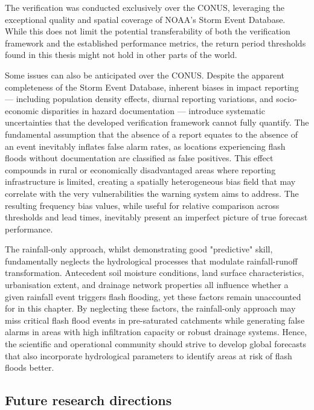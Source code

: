 The verification was conducted exclusively over the CONUS, leveraging the exceptional quality and spatial coverage of NOAA's Storm Event Database. While this does not limit the potential transferability of both the verification framework and the established performance metrics, the return period thresholds found in this thesis might not hold in other parts of the world. 

Some issues can also be anticipated over the CONUS. Despite the apparent completeness of the Storm Event Database, inherent biases in impact reporting — including population density effects, diurnal reporting variations, and socio-economic disparities in hazard documentation \citep{Marjerison_2016} — introduce systematic uncertainties that the developed verification framework cannot fully quantify. The fundamental assumption that the absence of a report equates to the absence of an event inevitably inflates false alarm rates, as locations experiencing flash floods without documentation are classified as false positives. This effect compounds in rural or economically disadvantaged areas where reporting infrastructure is limited, creating a spatially heterogeneous bias field that may correlate with the very vulnerabilities the warning system aims to address. The resulting frequency bias values, while useful for relative comparison across thresholds and lead times, inevitably present an imperfect picture of true forecast performance.

The rainfall-only approach, whilst demonstrating good "predictive" skill, fundamentally neglects the hydrological processes that modulate rainfall-runoff transformation. Antecedent soil moisture conditions, land surface characteristics, urbanisation extent, and drainage network properties all influence whether a given rainfall event triggers flash flooding, yet these factors remain unaccounted for in this chapter. By neglecting these factors, the rainfall-only approach may miss critical flash flood events in pre-saturated catchments while generating false alarms in areas with high infiltration capacity or robust drainage systems. Hence, the scientific and operational community should strive to develop global forecasts that also incorporate hydrological parameters to identify areas at risk of flash floods better.

\subsection{Future research directions}

